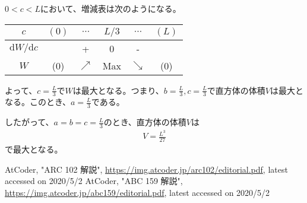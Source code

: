 \documentclass[12pt]{jarticle}
\begin{document}
$0 < c < L$において、増減表は次のようになる。
\begin{table}[H]
	\begin{center}
		\begin{tabular}{|c||c|c|c|c|c|} \hline
			$c$ & $(0)$ & $\cdots$ & $L / 3$ & $\cdots$ & $(L)$ \\ \hline \hline
			$\mathrm{d}W / \mathrm{d}c$ &  & + & 0 & - & \\ \hline
			$W$ & (0) & $\nearrow$ & Max & $\searrow$ & (0) \\ \hline
		\end{tabular}
	\end{center}
\end{table}

よって、$c = \frac{L}{3}$で$W$は最大となる。つまり、$b = \frac{L}{3}, c = \frac{L}{3}$で直方体の体積$V$は最大となる。このとき、$a = \frac{L}{3}$である。

したがって、$a = b = c = \frac{L}{3}$のとき、直方体の体積$V$は
\begin{eqnarray*}
	V = \frac{L^3}{27}
\end{eqnarray*}
で最大となる。


\begin{thebibliography}{5}
	 AtCoder, "ARC 102 解説", \url{https://img.atcoder.jp/arc102/editorial.pdf}, latest accessed on 2020/5/2
	 AtCoder, "ABC 159 解説", \url{https://img.atcoder.jp/abc159/editorial.pdf}, latest accessed on 2020/5/2
\end{thebibliography}
\end{document}
